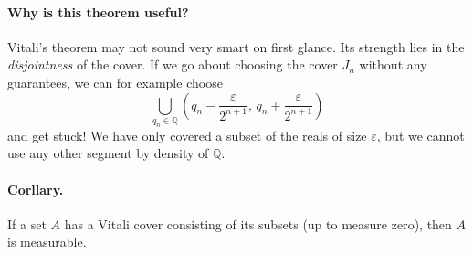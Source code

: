 \paragraph{Why is this theorem useful?} Vitali's theorem may not sound very smart on first glance. Its strength lies in the \emph{disjointness} of the cover. If we go about choosing the cover \( J_n \) without any guarantees, we can for example choose
\[ 
    \bigcup_{q_n \in \mathbb{Q}} \left(q_n - \frac{\varepsilon}{2^{n+1}},\,q_n + \frac{\varepsilon }{2^{n+1}}\right) 
\]
and get stuck! We have only covered a subset of the reals of size \(\varepsilon \), but we cannot use any other segment by density of \( \mathbb{Q} \).

\paragraph{Corllary.} If a set \( A \) has a Vitali cover consisting of its subsets (up to measure zero), then \( A \) is measurable.

